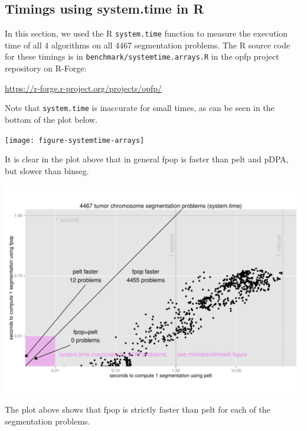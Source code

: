 \documentclass{article}
\begin{document}
\subsection{Timings using system.time in R}

In this section, we used the R \verb|system.time| function to measure
the execution time of all 4 algorithms on all 4467 segmentation
problems. The R source code for these timings is in
\verb|benchmark/systemtime.arrays.R| in the opfp project repository on
R-Forge:

\url{https://r-forge.r-project.org/projects/opfp/}

Note that \verb|system.time| is inaccurate for small times, as can be
seen in the bottom of the plot below.

\begin{center}
  \texttt{[image: figure-systemtime-arrays]}
\end{center}

It is clear in the plot above that in general fpop is faster than pelt
and pDPA, but slower than binseg.

\begin{center}
  \includegraphics[width=\textwidth]{figure-systemtime-arrays-fpop-pelt}
\end{center}

The plot above shows that fpop is strictly faster than pelt for each
of the segmentation problems. 
\end{document}
